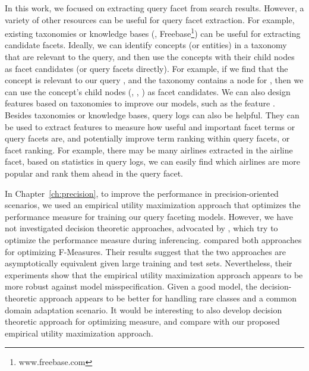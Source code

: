 In this work, we focused on extracting query facet from search results. However, a variety of other resources can be useful for query facet extraction. For example, existing taxonomies or knowledge bases (\eg, Freebase\footnote{www.freebase.com}) can be useful for extracting candidate facets. Ideally, we can identify concepts (or entities) in a taxonomy that are relevant to the query, and then use the concepts with their child nodes as facet candidates (or query facets directly). For example, if we find that the concept  is relevant to our query , and the taxonomy contains a node for , then we can use the concept's child nodes (, , ) as facet candidates. We can also design features based on taxonomies to improve our models, such as the feature . Besides taxonomies or knowledge bases, query logs can also be helpful. They can be used 
to extract 
features to measure how useful and important facet terms or query facets are, and potentially improve term ranking within query facets, or facet ranking. For example, there may be many airlines extracted in the airline facet, based on statistics in query logs, we can easily find which airlines are more popular and rank them ahead in the query facet.

In Chapter~\ref{ch:precision}, to improve the performance in precision-oriented scenarios, we used an empirical utility maximization approach that optimizes the performance measure for training our query faceting models. However, we have not investigated  decision theoretic approaches, advocated by \citet{lewis1995evaluating}, which try to optimize the performance measure during inferencing. \citet{nan2012optimizing} compared both approaches for optimizing F-Measures. Their results suggest that the two approaches are asymptotically equivalent given large training and test sets. Nevertheless, their experiments show that the empirical utility maximization approach appears to be more robust against model misspecification. Given a good model, the decision-theoretic approach appears to be better for handling rare classes and a common domain adaptation scenario. It would be interesting to also develop decision theoretic approach for optimizing \PRF measure, and compare with our proposed empirical utility 
maximization 
approach.


